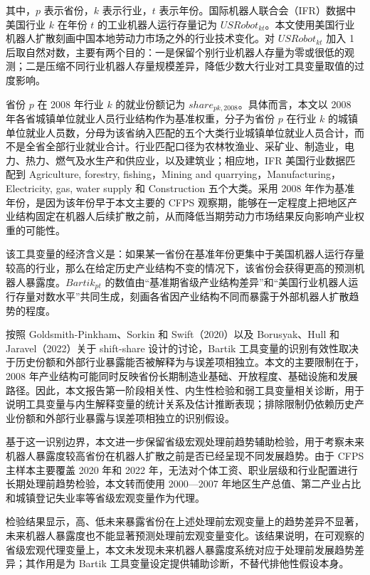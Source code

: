 其中，\(p\) 表示省份，\(k\) 表示行业，\(t\) 表示年份。国际机器人联合会（IFR）数据中美国行业 \(k\) 在年份 \(t\) 的工业机器人运行存量记为 \(USRobot_{kt}\)。本文使用美国行业机器人扩散刻画中国本地劳动力市场之外的行业技术变化。对 \(USRobot_{kt}\) 加入 1 后取自然对数，主要有两个目的：一是保留个别行业机器人存量为零或很低的观测；二是压缩不同行业机器人存量规模差异，降低少数大行业对工具变量取值的过度影响。

省份 \(p\) 在 2008 年行业 \(k\) 的就业份额记为 \(share_{pk,2008}\)。具体而言，本文以 2008 年各省城镇单位就业人员行业结构作为基准权重，分子为省份 \(p\) 在行业 \(k\) 的城镇单位就业人员数，分母为该省纳入匹配的五个大类行业城镇单位就业人员合计，而不是全省全部行业就业合计。行业匹配口径为农林牧渔业、采矿业、制造业，电力、热力、燃气及水生产和供应业，以及建筑业；相应地，IFR 美国行业数据匹配到 Agriculture, forestry, fishing，Mining and quarrying，Manufacturing，Electricity, gas, water supply 和 Construction 五个大类。采用 2008 年作为基准年份，是因为该年份早于本文主要的 CFPS 观察期，能够在一定程度上把地区产业结构固定在机器人后续扩散之前，从而降低当期劳动力市场结果反向影响产业权重的可能性。

该工具变量的经济含义是：如果某一省份在基准年份更集中于美国机器人运行存量较高的行业，那么在给定历史产业结构不变的情况下，该省份会获得更高的预测机器人暴露度。\(Bartik_{pt}\) 的数值由``基准期省级产业结构差异''和``美国行业机器人运行存量对数水平''共同生成，刻画各省因产业结构不同而暴露于外部机器人扩散趋势的程度。

按照 Goldsmith-Pinkham、Sorkin 和 Swift（2020）以及 Borusyak、Hull 和 Jaravel（2022）关于 shift-share 设计的讨论，Bartik 工具变量的识别有效性取决于历史份额和外部行业暴露能否被解释为与误差项相独立。本文的主要限制在于，2008 年产业结构可能同时反映省份长期制造业基础、开放程度、基础设施和发展路径。因此，本文报告第一阶段相关性、内生性检验和弱工具变量相关诊断，用于说明工具变量与内生解释变量的统计关系及估计推断表现；排除限制仍依赖历史产业份额和外部行业暴露与误差项相独立的识别假设。

基于这一识别边界，本文进一步保留省级宏观处理前趋势辅助检验，用于考察未来机器人暴露度较高省份在机器人扩散之前是否已经呈现不同发展趋势。由于 CFPS 主样本主要覆盖 2020 年和 2022 年，无法对个体工资、职业层级和行业配置进行长期处理前趋势检验，本文转而使用 2000---2007 年地区生产总值、第二产业占比和城镇登记失业率等省级宏观变量作为代理。

检验结果显示，高、低未来暴露省份在上述处理前宏观变量上的趋势差异不显著，未来机器人暴露度也不能显著预测处理前宏观变量变化。该结果说明，在可观察的省级宏观代理变量上，本文未发现未来机器人暴露度系统对应于处理前发展趋势差异；其作用是为 Bartik 工具变量设定提供辅助诊断，不替代排他性假设本身。

